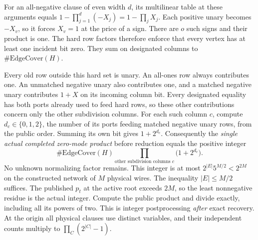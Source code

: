 \documentclass[11pt,a4paper]{article}
\begin{document}
For an all-negative clause of even width \(d\), its multilinear table at
these arguments equals \(1-\prod_{j=1}^d(-X_j)=1-\prod_j X_j\). Each
positive unary becomes \(-X_v\), so it forces \(X_v=1\) at the price of
a sign. There are \(o\) such signs and their product is one. The hard
row factors therefore enforce that every vertex has at least one
incident bit zero. They sum on designated columns to
\(\#\mathrm{EdgeCover}(H)\).

Every old row outside this hard set is unary. An all-ones row always
contributes one. An unmatched negative unary also contributes one, and a
matched negative unary contributes \(1+X\) on its incoming column bit.
Every designated equality has both ports already used to feed hard rows,
so these other contributions concern only the other subdivision columns.
For each such column \(c\), compute \(d_c\in\{0,1,2\}\), the number of
its ports feeding matched negative unary rows, from the public order.
Summing its own bit gives \(1+2^{d_c}\). Consequently the \emph{single
actual completed zero-mode product} before reduction equals the positive
integer \[
    \#\mathrm{EdgeCover}(H)\prod_{\text{other subdivision columns }c}
                                   \bigl(1+2^{d_c}\bigr).
\tag{A6}
\] No unknown normalizing factor remains. This integer is at most
\(2^{|E|}5^{M/2}<2^{2M}\) on the constructed network of \(M\) physical
wires. The inequality \(|E|\le M/2\) suffices. The published \(p_t\) at
the active root exceeds \(2M\), so the least nonnegative residue is the
actual integer. Compute the public product and divide exactly, including
all its powers of two. This is integer postprocessing \emph{after} exact
recovery. At the origin all physical clauses use distinct variables, and
their independent counts multiply to \(\prod_C (2^{|C|}-1)\).
\end{document}
